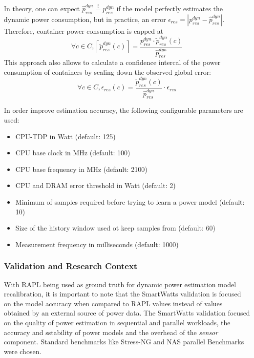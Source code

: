 In theory, one can expect $\hat{p}_{res}^{dyn} \overset{!}{=} {p}_{res}^{dyn}$ if the model perfectly estimates the dynamic power consumption, but in practice, an error $\epsilon_{res} = \left| {p}_{res}^{dyn} - \hat{p}_{res}^{dyn} \right|$. Therefore, container power consumption is capped at
\begin{equation}
    \forall c \in C, \left\lceil \tilde{p}_{res}^{dyn}(c) \right\rceil = \frac{{p}_{res}^{dyn} \cdot \tilde{p}_{res}^{dyn}(c)}{\hat{p}_{res}^{dyn}}
\end{equation}
This approach also allows to calculate a confidence intercal of the power consumption of containers by scaling down the observed global error:
\begin{equation}
    \forall c \in C, \epsilon_{res}(c) = \frac{\tilde{p}_{res}^{dyn}(c)}{\hat{p}_{res}^{dyn}} \cdot \epsilon_{res}
\end{equation}

In order improve estimation accuracy, the following configurable parameters are used:
\begin{itemize}
    \item CPU-TDP in Watt (default: 125)
    \item CPU base clock in MHz (default: 100)
    \item CPU base frequency in MHz (default: 2100)
    \item CPU and DRAM error threshold in Watt (default: 2)
    \item Minimum of samples required before trying to learn a power model (default: 10)
    \item Size of the history window used ot keep samples from (default: 60)
    \item Measurement frequency in milliseconds (default: 1000)
\end{itemize}
\subsubsection{Validation and Research Context}
\label{sec:smartwatts-validation}
With RAPL being used as ground truth for dynamic power estimation model recalibration, it is important to note that the SmartWatts validation is focused on the model accuracy when compared to RAPL values instead of values obtained by an external source of power data. The SmartWatts validation focused on the quality of power estimation in sequential and parallel workloads, the accuracy and sstability of power models and the overhead of the \textit{sensor} component. Standard benchmarks like Stress-NG and NAS parallel Benchmarks were chosen. 

